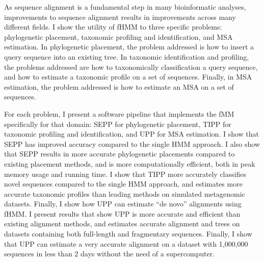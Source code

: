 \documentclass[12pt]{report}	%
\theoremstyle{definition}
\theoremstyle{remark}
\begin{document}
As sequence alignment is a fundamental step in many bioinformatic analyses, improvements to sequence alignment results in improvements across many different fields.  I show the utility of fHMM to three specific problems: phylogenetic placement, taxonomic profiling and identification, and MSA estimation.  In phylogenetic placement, the problem addressed is how to insert a query sequence into an existing tree.  In taxonomic identification and profiling, the problems addressed are how to taxonomically classification a query sequence, and how to estimate a taxonomic profile on a set of sequences.  Finally, in MSA estimation, the problem addressed is how to estimate an MSA on a set of sequences.  

For each problem, I present a software pipeline that implements the fMM specifically for that domain: SEPP for phylogenetic placement, TIPP for taxonomic profiling and identification, and UPP for MSA estimation.  I show that SEPP has improved accuracy compared to the single HMM approach.  I also show that SEPP results in more accurate phylogenetic placements compared to existing placement methods, and is more computationally efficient, both in peak memory usage and running time.  I show that TIPP more accurately classifies novel sequences compared to the single HMM approach, and estimates more accurate taxonomic profiles than leading methods on simulated metagenomic datasets.  Finally, I show how UPP can estimate ``de novo'' alignments using fHMM.  I present results that show UPP is more accurate and efficient than existing alignment methods, and estimates accurate alignment and trees on datasets containing both full-length and fragmentary sequences.  Finally, I show that UPP can estimate a very accurate alignment on a dataset with 1,000,000 sequences in less than 2 days without the need of a supercomputer.



\tableofcontents   %

\listoftables      %
\listoffigures     %



%
%
% 
% 
% 
% 
% 
% 







\end{document}
